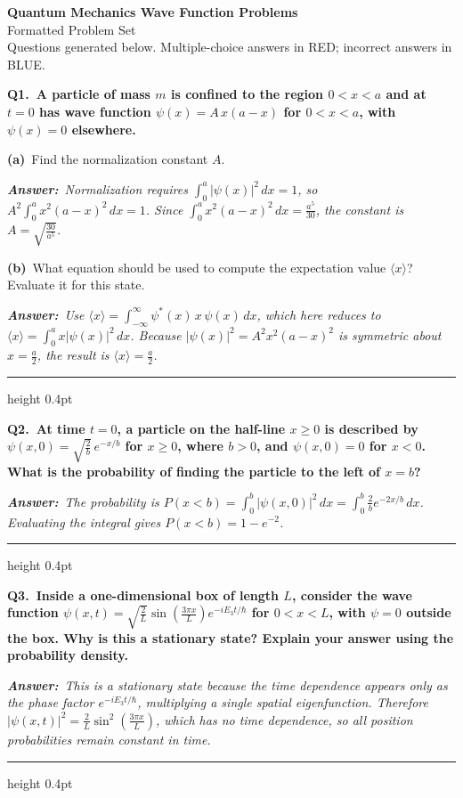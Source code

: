 \documentclass[11pt]{article}
\newcommand{\QuestionStyle}[1]{{\large\bfseries\boldmath #1}}
\newcommand{\OEBlock}[3]{%
  \Needspace{5\baselineskip}%
  \noindent
  \begin{minipage}{\linewidth}
    \QuestionStyle{#1.~#2}

    \vspace{0.25em}
    \noindent\textcolor{AnsRed}{\textit{\textbf{Answer:}~#3}}

    \vspace{0.25em}
    \hrule height 0.4pt
  \end{minipage}
  \vspace{0.75em}
}
\newcommand{\MPBlock}[3]{%
  \Needspace{8\baselineskip}%
  \noindent
  \begin{minipage}{\linewidth}
    \QuestionStyle{#1.~#2}

    \vspace{0.25em}
    #3

    \vspace{0.25em}
    \hrule height 0.4pt
  \end{minipage}
  \vspace{0.75em}
}
\newcommand{\OEPart}[3]{%
  \par\vspace{0.35em}
  \noindent\textbf{(#1)}~#2
  \par\vspace{0.15em}
  \noindent\textit{\textbf{Answer:}~#3}
  \par
}
\begin{document}
\begin{center}
{\huge \textbf{Quantum Mechanics Wave Function Problems}}\\[0.25em]
{\Large Formatted Problem Set}\\[0.25em]
{\large Questions generated below. Multiple-choice answers in RED; incorrect answers in BLUE.}
\end{center}

\vspace{0.75em}

\MPBlock{Q1}{A particle of mass $m$ is confined to the region $0<x<a$ and at $t=0$ has wave function $\psi(x)=A\,x(a-x)$ for $0<x<a$, with $\psi(x)=0$ elsewhere.}{%
\OEPart{a}{Find the normalization constant $A$.}{Normalization requires $\int_0^a |\psi(x)|^2\,dx=1$, so $A^2\int_0^a x^2(a-x)^2\,dx=1$. Since $\int_0^a x^2(a-x)^2\,dx=\frac{a^5}{30}$, the constant is $A=\sqrt{\frac{30}{a^5}}$.}
\OEPart{b}{What equation should be used to compute the expectation value $\langle x\rangle$? Evaluate it for this state.}{Use $\langle x\rangle=\int_{-\infty}^{\infty}\psi^*(x)\,x\,\psi(x)\,dx$, which here reduces to $\langle x\rangle=\int_0^a x|\psi(x)|^2\,dx$. Because $|\psi(x)|^2=A^2x^2(a-x)^2$ is symmetric about $x=\tfrac{a}{2}$, the result is $\langle x\rangle=\tfrac{a}{2}$.}
}

\OEBlock{Q2}{At time $t=0$, a particle on the half-line $x\ge 0$ is described by $\psi(x,0)=\sqrt{\frac{2}{b}}\,e^{-x/b}$ for $x\ge 0$, where $b>0$, and $\psi(x,0)=0$ for $x<0$. What is the probability of finding the particle to the left of $x=b$?}{The probability is $P(x<b)=\int_0^b |\psi(x,0)|^2\,dx=\int_0^b \frac{2}{b}e^{-2x/b}\,dx$. Evaluating the integral gives $P(x<b)=1-e^{-2}$.}

\OEBlock{Q3}{Inside a one-dimensional box of length $L$, consider the wave function $\psi(x,t)=\sqrt{\frac{2}{L}}\sin\!\left(\frac{3\pi x}{L}\right)e^{-iE_3 t/\hbar}$ for $0<x<L$, with $\psi=0$ outside the box. Why is this a stationary state? Explain your answer using the probability density.}{This is a stationary state because the time dependence appears only as the phase factor $e^{-iE_3 t/\hbar}$, multiplying a single spatial eigenfunction. Therefore $|\psi(x,t)|^2=\frac{2}{L}\sin^2\!\left(\frac{3\pi x}{L}\right)$, which has no time dependence, so all position probabilities remain constant in time.}
\end{document}
